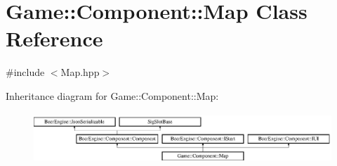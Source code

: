 \hypertarget{class_game_1_1_component_1_1_map}{}\section{Game\+:\+:Component\+:\+:Map Class Reference}
\label{class_game_1_1_component_1_1_map}


{\ttfamily \#include $<$Map.\+hpp$>$}

Inheritance diagram for Game\+:\+:Component\+:\+:Map\+:\begin{figure}[H]
\begin{center}
\leavevmode
\includegraphics[height=1.875000cm]{class_game_1_1_component_1_1_map}
\end{center}
\end{figure}
